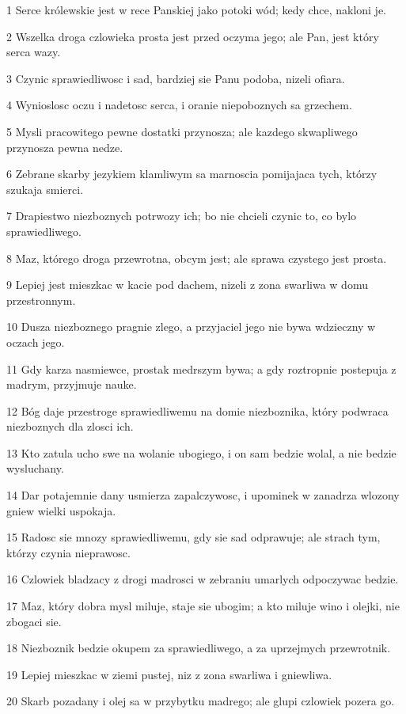 \par 1 Serce królewskie jest w rece Panskiej jako potoki wód; kedy chce, nakloni je.
\par 2 Wszelka droga czlowieka prosta jest przed oczyma jego; ale Pan, jest który serca wazy.
\par 3 Czynic sprawiedliwosc i sad, bardziej sie Panu podoba, nizeli ofiara.
\par 4 Wynioslosc oczu i nadetosc serca, i oranie niepoboznych sa grzechem.
\par 5 Mysli pracowitego pewne dostatki przynosza; ale kazdego skwapliwego przynosza pewna nedze.
\par 6 Zebrane skarby jezykiem klamliwym sa marnoscia pomijajaca tych, którzy szukaja smierci.
\par 7 Drapiestwo niezboznych potrwozy ich; bo nie chcieli czynic to, co bylo sprawiedliwego.
\par 8 Maz, którego droga przewrotna, obcym jest; ale sprawa czystego jest prosta.
\par 9 Lepiej jest mieszkac w kacie pod dachem, nizeli z zona swarliwa w domu przestronnym.
\par 10 Dusza niezboznego pragnie zlego, a przyjaciel jego nie bywa wdzieczny w oczach jego.
\par 11 Gdy karza nasmiewce, prostak medrszym bywa; a gdy roztropnie postepuja z madrym, przyjmuje nauke.
\par 12 Bóg daje przestroge sprawiedliwemu na domie niezboznika, który podwraca niezboznych dla zlosci ich.
\par 13 Kto zatula ucho swe na wolanie ubogiego, i on sam bedzie wolal, a nie bedzie wysluchany.
\par 14 Dar potajemnie dany usmierza zapalczywosc, i upominek w zanadrza wlozony gniew wielki uspokaja.
\par 15 Radosc sie mnozy sprawiedliwemu, gdy sie sad odprawuje; ale strach tym, którzy czynia nieprawosc.
\par 16 Czlowiek bladzacy z drogi madrosci w zebraniu umarlych odpoczywac bedzie.
\par 17 Maz, który dobra mysl miluje, staje sie ubogim; a kto miluje wino i olejki, nie zbogaci sie.
\par 18 Niezboznik bedzie okupem za sprawiedliwego, a za uprzejmych przewrotnik.
\par 19 Lepiej mieszkac w ziemi pustej, niz z zona swarliwa i gniewliwa.
\par 20 Skarb pozadany i olej sa w przybytku madrego; ale glupi czlowiek pozera go.

